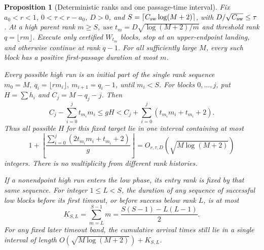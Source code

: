\documentclass[11pt]{article}
\newtheorem{proposition}{Proposition}
\theoremstyle{remark}\newtheorem{remark}[proposition]{Remark}
\begin{document}
\begin{proposition}[Deterministic ranks and one passage-time interval]
\label{prop:shaik-time-corridor}
Fix \(a_0<r<1\), \(0<\tau<r-a_0\), \(D>0\), and
\(S=\lceil C_{\rm sw}\log(M+2)\rceil\), with
\(D/\sqrt{C_{\rm sw}}\le\tau\).
At a high parent rank \(m\ge S\), use
\(t_m=D\sqrt{\log(M+2)/m}\) and threshold rank \(q=\lfloor rm\rfloor\).
Execute only certified \(W_{t_m}\) blocks, stop at an upper-endpoint
landing, and otherwise continue at rank \(q-1\).
For all sufficiently large \(M\), every such block has a positive
first-passage duration at most \(m\).

Every possible high run is an initial part of the single rank sequence
\(m_0=M,\ q_i=\lfloor rm_i\rfloor,\ m_{i+1}=q_i-1\), until \(m_i<S\).
For blocks \(0,\ldots,j\), put \(H=\sum h_i\) and \(C_j=M-q_j-j\).
Then
\begin{equation}\label{eq:shaik-one-sided-corridor}
 C_j-\sum_{i=0}^j t_{m_i}m_i
 \le gH<
 C_j+\sum_{i=0}^j(t_{m_i}m_i+t_{m_i}+2).
\end{equation}
Thus all possible \(H\) for this fixed target lie in one interval
containing at most
\[
 1+\left\lfloor
 \frac{\sum_{i=0}^j(2t_{m_i}m_i+t_{m_i}+2)}{g}
 \right\rfloor
 =O_{r,\tau,D}(\sqrt{M\log(M+2)})
\]
integers. There is no multiplicity from different rank histories.

If a nonendpoint high run enters the low phase, its entry rank is
fixed by that same sequence. For integer \(1\le L<S\), the duration
of any sequence of successful low blocks before its first timeout,
or before success below rank \(L\), is at most
\begin{equation}\label{eq:shaik-low-triangle}
 K_{S,L}=\sum_{m=L}^{S-1}m
 =\frac{S(S-1)-L(L-1)}2.
\end{equation}
For any fixed later timeout band, the cumulative arrival times still
lie in a single interval of length
\(O(\sqrt{M\log(M+2)})+K_{S,L}\).
\end{proposition}
\end{document}

